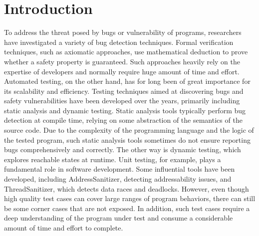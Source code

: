 \chapter{\label{cha:intro}Introduction}

\listoftodos{}


To address the threat posed by bugs or vulnerability of programs, researchers have investigated a variety of bug detection techniques. Formal verification techniques, such as axiomatic approaches, use mathematical deduction to prove whether a safety property is guaranteed. Such approaches heavily rely on the expertise of developers and normally require huge amount of time and effort\cite{sel4}.
Automated testing, on the other hand, has for long been of great importance for its scalability and efficiency. Testing techniques aimed at discovering bugs and safety vulnerabilities have been developed over the years, primarily including static analysis and dynamic testing. Static analysis tools\cite{infer, RacerD} typically perform bug detection at compile time, relying on some abstraction of the semantics of the source code. 
Due to the complexity of the programming language and the logic of the tested program, such static analysis tools sometimes do not ensure reporting bugs comprehensively and correctly. The other way is dynamic testing, which explores reachable states at runtime. Unit testing, for example, plays a fundamental role in software development. Some influential tools have been developed, including AddressSanitizer\cite{ASAN}, detecting addressability issues, and ThreadSanitizer\cite{TSAN}, which detects data races and deadlocks. However, even though high quality test cases can cover large ranges of program behaviors, there can still be some corner cases that are not exposed. In addition, such test cases require a deep understanding of the program under test and consume a considerable amount of time and effort to complete. 


